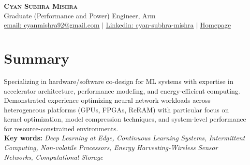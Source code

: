 \documentclass[letterpaper,11pt]{article}
\begin{document}

\begin{center}
    \textbf{\Huge \scshape Cyan Subhra Mishra} \\ \vspace{1pt}
     \small Graduate (Performance and Power) Engineer, Arm \\
    \href{mailto:cyanmishra92@gmail.com}{\underline{email: cyanmishra92@gmail.com}} $|$ 
    \href{https://www.linkedin.com/in/cyan-subhra-mishra/}{\underline{Linkedin: cyan-subhra-mishra}} $|$
    \href{https://sites.google.com/view/cyansubhramishra/}{\underline{Homepage}}
\end{center}

\section{Summary}
Specializing in hardware/software co-design for ML systems with expertise in accelerator architecture, performance modeling, and energy-efficient computing. Demonstrated experience optimizing neural network workloads across heterogeneous platforms (GPUs, FPGAs, ReRAM) with particular focus on kernel optimization, model compression techniques, and system-level performance for resource-constrained environments.\\
\textbf{Key words:} \textit{Deep Learning at Edge, Continuous Learning Systems, Intermittent Computing, Non-volatile Processors, 
Energy Harvesting-Wireless Sensor Networks, Computational Storage}
\end{document}
